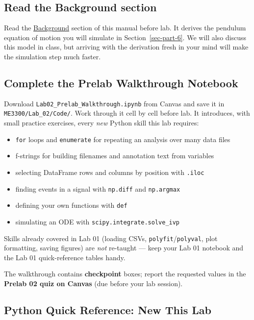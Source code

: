 \documentclass[
  12pt,
  letterpaper,
]{article}
\providecommand{\tightlist}{%
  \setlength{\itemsep}{0pt}\setlength{\parskip}{0pt}}
\begin{document}
\subsection{Read the Background
section}\label{read-the-background-section}

Read the \hyperref[sec-background]{Background} section of this manual
before lab. It derives the pendulum equation of motion you will simulate
in Section~\ref{sec-part-6}. We will also discuss this model in class,
but arriving with the derivation fresh in your mind will make the
simulation step much faster.

\subsection{Complete the Prelab Walkthrough
Notebook}\label{sec-prelab-walkthrough}

Download \texttt{Lab02\_Prelab\_Walkthrough.ipynb} from Canvas and save
it in \texttt{ME3300/Lab\_02/Code/}. Work through it cell by cell before
lab. It introduces, with small practice exercises, every \emph{new}
Python skill this lab requires:

\begin{itemize}
\tightlist
\item
  \texttt{for} loops and \texttt{enumerate} for repeating an analysis
  over many data files
\item
  f-strings for building filenames and annotation text from variables
\item
  selecting DataFrame rows and columns by position with \texttt{.iloc}
\item
  finding events in a signal with \texttt{np.diff} and
  \texttt{np.argmax}
\item
  defining your own functions with \texttt{def}
\item
  simulating an ODE with \texttt{scipy.integrate.solve\_ivp}
\end{itemize}

Skills already covered in Lab 01 (loading CSVs,
\texttt{polyfit}/\texttt{polyval}, plot formatting, saving figures) are
\emph{not} re-taught --- keep your Lab 01 notebook and the Lab 01
quick-reference tables handy.

The walkthrough contains \textbf{checkpoint} boxes; report the requested
values in the \textbf{Prelab 02 quiz on Canvas} (due before your lab
session).

\subsection{Python Quick Reference: New This
Lab}\label{python-quick-reference-new-this-lab}
\end{document}
